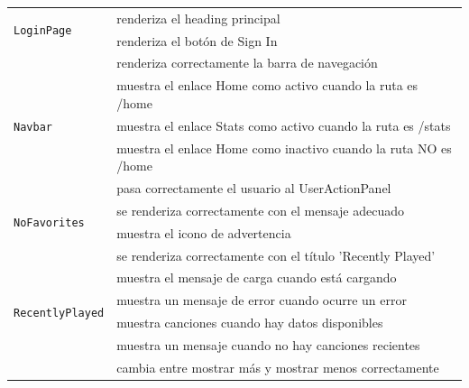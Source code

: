 \begin{longtable}{|p{5cm}|p{9cm}|}
  \multirow{2}{*}{\texttt{LoginPage}}             & renderiza el heading principal                                               \\ \cline{2-2}
                                                  & renderiza el botón de Sign In                                                \\ \hline

  \multirow{5}{*}{\texttt{Navbar}}                & renderiza correctamente la barra de navegación                               \\ \cline{2-2}
                                                  & muestra el enlace Home como activo cuando la ruta es /home                   \\ \cline{2-2}
                                                  & muestra el enlace Stats como activo cuando la ruta es /stats                 \\ \cline{2-2}
                                                  & muestra el enlace Home como inactivo cuando la ruta NO es /home              \\ \cline{2-2}
                                                  & pasa correctamente el usuario al UserActionPanel                             \\ \hline

  \multirow{2}{*}{\texttt{NoFavorites}}           & se renderiza correctamente con el mensaje adecuado                           \\ \cline{2-2}
                                                  & muestra el icono de advertencia                                              \\ \hline

  \multirow{6}{*}{\texttt{RecentlyPlayed}}        & se renderiza correctamente con el título 'Recently Played'                   \\ \cline{2-2}
                                                  & muestra el mensaje de carga cuando está cargando                             \\ \cline{2-2}
                                                  & muestra un mensaje de error cuando ocurre un error                           \\ \cline{2-2}
                                                  & muestra canciones cuando hay datos disponibles                               \\ \cline{2-2}
                                                  & muestra un mensaje cuando no hay canciones recientes                         \\ \cline{2-2}
                                                  & cambia entre mostrar más y mostrar menos correctamente                       \\ \hline


\end{longtable}
